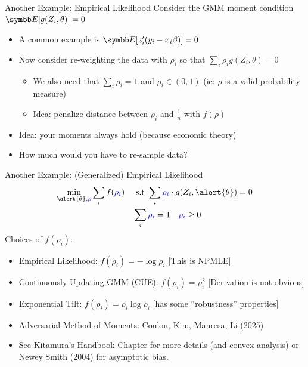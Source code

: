 \documentclass[aspectratio=169,11pt]{beamer}
\begin{document}
\begin{frame}{Another Example: Empirical Likelihood}
Consider the GMM moment condition $\E[g(Z_i,\theta)]=0$
\begin{itemize}
\item A common example is $\E[z_i' (y_i-x_i \beta)]=0$
\item Now consider re-weighting the data with $\rho_i$ so that $\sum_i \rho_i g(Z_i,\theta)=0$
\begin{itemize}
\item We also need that $\sum_i \rho_i =1$ and $\rho_i \in (0,1)$ (ie: $\rho$ is a valid probability measure)
\item Idea: penalize distance between $\rho_i$ and $\frac{1}{n}$ with $f(\rho)$
\end{itemize}
\item Idea: your moments always hold (because economic theory)
\item How much would you have to re-sample data?
\end{itemize}
\end{frame}



\begin{frame}{Another Example: (Generalized) Empirical Likelihood}
\begin{align*}
\min_{\alert{\theta}, \textcolor{blue}{\rho} }\sum_i f(\textcolor{blue}{\rho_i}) \quad &\text{ s.t } \sum_i \textcolor{blue}{\rho_i} \cdot g(Z_i,\alert{\theta})= 0\\
& \sum_i \textcolor{blue}{\rho_i} =1 \quad \textcolor{blue}{\rho_i} \geq 0
\end{align*}
Choices of $f(\rho_i)$:
\begin{itemize}
\item Empirical Likelihood: $f(\rho_i) = - \log \rho_i$ [This is NPMLE]
\item Continuously Updating GMM (CUE): $f(\rho_i) = \rho_i^2$ [Derivation is \alert{not} obvious]
\item Exponential Tilt: $f(\rho_i) = \rho_i \log \rho_i $ [has some ``robustness'' properties]
\item Adversarial Method of Moments: Conlon, Kim, Manresa, Li (2025)
\item See Kitamura's Handbook Chapter for more details (and convex analysis) or Newey Smith (2004) for asymptotic bias.
\end{itemize}
\end{frame}
\end{document}
